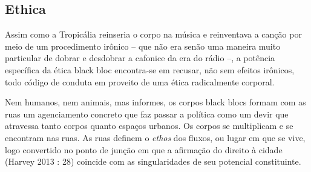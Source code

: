 \subsection{Ethica}

Assim como a Tropicália reinseria o corpo na música e
reinventava a canção por meio de um procedimento irônico -- que não era
senão uma maneira muito particular de dobrar e desdobrar a cafonice da
era do rádio --, a potência específica da ética black bloc encontra-se
em recusar, não sem efeitos irônicos, todo código de conduta em proveito
de uma ética radicalmente corporal.

Nem humanos, nem animais, mas informes, os corpos black blocs formam com
as ruas um agenciamento concreto que faz passar a política como um devir
que atravessa tanto corpos quanto espaços urbanos. Os corpos se
multiplicam e se encontram nas ruas. As ruas definem o \emph{ethos }dos
fluxos, ou lugar em que se vive, logo convertido no ponto de junção em
que a afirmação do direito à cidade (Harvey 2013 : 28) coincide com as
singularidades de seu potencial constituinte.

